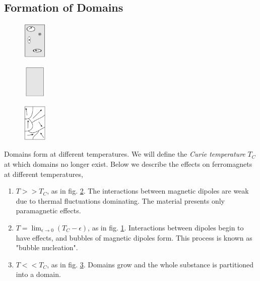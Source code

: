 \documentclass{book}
\begin{document}
\subsection{Formation of Domains}
\begin{figure}
	\centering
	\includegraphics[width=0.1\textwidth]{T=T_c - Epsilon.png}
	\caption{}
	\label{fig:t - e}
\end{figure}
\begin{figure}
	\centering
	\includegraphics[width=0.1\textwidth]{T_T_C.png}
	\caption{}
	\label{fig:t=tc}
\end{figure}
\begin{figure}
	\centering
	\includegraphics[width=0.1\textwidth]{T__T_C.png}
	\caption{}
	\label{fig: t < tc}
\end{figure}
Domains form at different temperatures. We will define the \textit{Curie temperature} $T_C$ at which domains no longer exist. Below we describe the effects on ferromagnets at different temperatures,
\begin{enumerate}
	\item $T >> T_C$, as in fig. \ref{fig:t=tc}. The interactions between magnetic dipoles are weak due to thermal fluctuations dominating. The material presents only paramagnetic effects.
	\item $T = \lim_{\epsilon \to 0}(T_C - \epsilon)$, as in fig. \ref{fig:t - e}. Interactions between dipoles begin to have effects, and bubbles of magnetic dipoles form. This process is known as "bubble nucleation".
	\item $T << T_C$, as in fig. \ref{fig: t < tc}. Domains grow and the whole substance is partitioned into a domain.
\end{enumerate}
\end{document}
